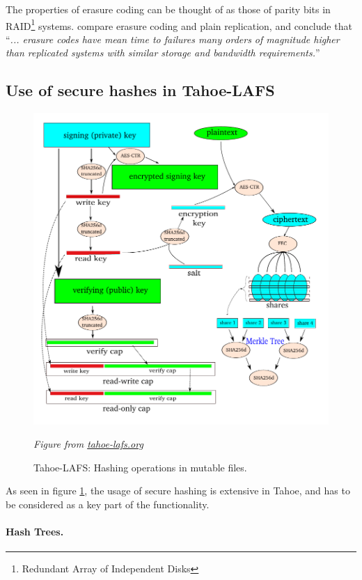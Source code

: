 \documentclass[english,12pt,a4paper]{book}
\begin{document}
The properties of erasure coding can be thought of as those of parity bits in
RAID\footnote{Redundant Array of Independent Disks} systems. \citet*{t_erasure}
compare erasure coding and plain replication, and conclude that ``\emph{...
erasure codes have mean time to failures many orders of magnitude higher than
replicated systems with similar storage and bandwidth requirements.}''

\subsection{Use of secure hashes in Tahoe-LAFS}

\begin{figure}[h]
    \centering
    \includegraphics[width=0.9\columnwidth]{Tahoe-hashing.pdf}
    \caption{Tahoe-LAFS: Hashing operations in mutable files.}
    \label{fig:tahoehashing}
    \emph{Figure from
     \href{http://tahoe-lafs.org/source/tahoe/trunk/docs/specifications/mut.svg}
     {tahoe-lafs.org}}
\end{figure}

As seen in figure \ref{fig:tahoehashing}, the usage of secure hashing is
extensive in Tahoe, and has to be considered as a key part of the functionality.

\paragraph{Hash Trees.}
\end{document}
